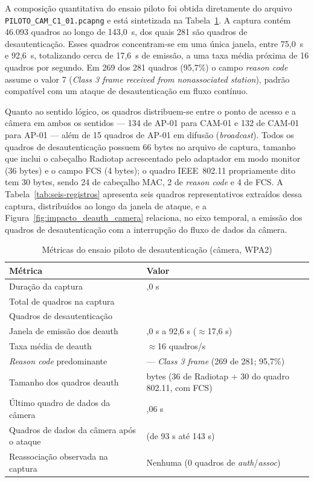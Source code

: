 A composição quantitativa do ensaio piloto foi obtida diretamente do arquivo \texttt{PILOTO\_CAM\_C1\_01.pcapng} e está sintetizada na Tabela~\ref{tab:metricas-piloto}. A captura contém 46.093 quadros ao longo de 143,0~s, dos quais 281 são quadros de desautenticação. Esses quadros concentram-se em uma única janela, entre 75,0~s e 92,6~s, totalizando cerca de 17,6~s de emissão, a uma taxa média próxima de 16 quadros por segundo. Em 269 dos 281 quadros (95,7\%) o campo \textit{reason code} assume o valor 7 (\textit{Class 3 frame received from nonassociated station}), padrão compatível com um ataque de desautenticação em fluxo contínuo.

Quanto ao sentido lógico, os quadros distribuem-se entre o ponto de acesso e a câmera em ambos os sentidos --- 134 de AP-01 para CAM-01 e 132 de CAM-01 para AP-01 --- além de 15 quadros de AP-01 em difusão (\textit{broadcast}). Todos os quadros de desautenticação possuem 66 bytes no arquivo de captura, tamanho que inclui o cabeçalho Radiotap acrescentado pelo adaptador em modo monitor (36 bytes) e o campo FCS (4 bytes); o quadro IEEE~802.11 propriamente dito tem 30 bytes, sendo 24 de cabeçalho MAC, 2 de \textit{reason code} e 4 de FCS. A Tabela~\ref{tab:seis-registros} apresenta seis quadros representativos extraídos dessa captura, distribuídos ao longo da janela de ataque, e a Figura~\ref{fig:impacto_deauth_camera} relaciona, no eixo temporal, a emissão dos quadros de desautenticação com a interrupção do fluxo de dados da câmera.

\begin{table}[htbp]
\centering
\caption{Métricas do ensaio piloto de desautenticação (câmera, WPA2)}
\label{tab:metricas-piloto}
\small
\begin{tabular}{|>{\raggedright\arraybackslash}p{}|>{\raggedright\arraybackslash}p{}|}
\hline
\textbf{Métrica} & \textbf{Valor} \\ \hline
Duração da captura & 143,0 s \\ \hline
Total de quadros na captura & 46.093 \\ \hline
Quadros de desautenticação & 281 \\ \hline
Janela de emissão dos deauth & 75,0 s a 92,6 s ($\approx$17,6 s) \\ \hline
Taxa média de deauth & $\approx$16 quadros/s \\ \hline
\textit{Reason code} predominante & 7 --- \textit{Class 3 frame} (269 de 281; 95,7\%) \\ \hline
Tamanho dos quadros deauth & 66 bytes (36 de Radiotap + 30 do quadro 802.11, com FCS) \\ \hline
Último quadro de dados da câmera & 75,06 s \\ \hline
Quadros de dados da câmera após o ataque & 0 (de 93 s até 143 s) \\ \hline
Reassociação observada na captura & Nenhuma (0 quadros de \textit{auth}/\textit{assoc}) \\ \hline
\end{tabular}
\end{table}



